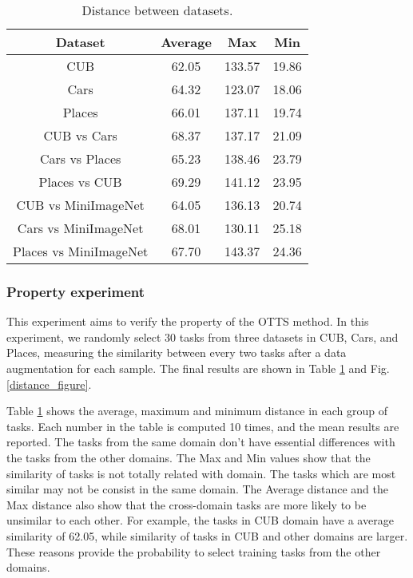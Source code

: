 \documentclass[10pt,journal,compsoc]{IEEEtran}
\begin{document}
\begin{table}[!t]
\renewcommand{\arraystretch}{1.8}
\caption{Distance between datasets.}
\label{distance_table}
\centering
\begin{tabular}{cccc}
\toprule
Dataset             &Average    &Max        &Min\\ 
\midrule
CUB                 &62.05      &133.57     &19.86\\
Cars                &64.32      &123.07     &18.06\\
Places              &66.01      &137.11     &19.74\\
\midrule
CUB vs Cars         &68.37      &137.17     &21.09\\
Cars vs Places      &65.23      &138.46     &23.79\\
Places vs CUB       &69.29      &141.12     &23.95\\
\midrule
CUB vs MiniImageNet &64.05      &136.13     &20.74\\
Cars vs MiniImageNet&68.01      &130.11     &25.18\\
Places vs MiniImageNet&67.70     &143.37     &24.36\\
\bottomrule
\end{tabular}
\end{table}

\subsubsection{Property experiment}

This experiment aims to verify the property of the OTTS method. In this experiment, we randomly select 30 tasks from three datasets in CUB, Cars, and Places, measuring the similarity between every two tasks after a data augmentation for each sample. The final results are shown in Table \ref{distance_table} and Fig. \ref{distance_figure}.

Table \ref{distance_table} shows the average, maximum and minimum distance in each group of tasks. Each number in the table is computed 10 times, and the mean results are reported. The tasks from the same domain don't have essential differences with the tasks from the other domains. 
The Max and Min values show that the similarity of tasks is not totally related with domain. The tasks which are most similar may not be consist in the same domain.
The Average distance and the Max distance also show that the cross-domain tasks are more likely to be unsimilar to each other. For example, the tasks in CUB domain have a average similarity of 62.05, while similarity of tasks in CUB and other domains are larger. These reasons provide the probability to select training tasks from the other domains.
\end{document}
